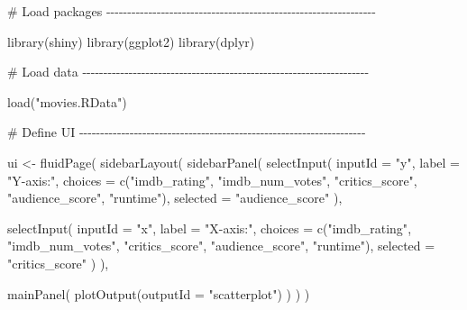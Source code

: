 \documentclass[
  letterpaper,
  DIV=11,
  numbers=noendperiod]{scrreprt}
\newenvironment{Shaded}{\begin{snugshade}}{\end{snugshade}}
\newcommand{\AttributeTok}[1]{\textcolor[rgb]{0.40,0.46,0.14}{#1}}
\newcommand{\CommentTok}[1]{\textcolor[rgb]{0.37,0.37,0.37}{#1}}
\newcommand{\FunctionTok}[1]{\textcolor[rgb]{0.28,0.35,0.67}{#1}}
\newcommand{\NormalTok}[1]{\textcolor[rgb]{0.00,0.46,0.62}{#1}}
\newcommand{\OtherTok}[1]{\textcolor[rgb]{0.00,0.46,0.62}{#1}}
\newcommand{\StringTok}[1]{\textcolor[rgb]{0.13,0.47,0.30}{#1}}
\begin{document}
\begin{Shaded}
\begin{Highlighting}[]
\CommentTok{\# Load packages {-}{-}{-}{-}{-}{-}{-}{-}{-}{-}{-}{-}{-}{-}{-}{-}{-}{-}{-}{-}{-}{-}{-}{-}{-}{-}{-}{-}{-}{-}{-}{-}{-}{-}{-}{-}{-}{-}{-}{-}{-}{-}{-}{-}{-}{-}{-}{-}{-}{-}{-}{-}{-}{-}{-}{-}{-}{-}{-}{-}{-}{-}{-}{-}}

\FunctionTok{library}\NormalTok{(shiny)}
\FunctionTok{library}\NormalTok{(ggplot2)}
\FunctionTok{library}\NormalTok{(dplyr)}

\CommentTok{\# Load data {-}{-}{-}{-}{-}{-}{-}{-}{-}{-}{-}{-}{-}{-}{-}{-}{-}{-}{-}{-}{-}{-}{-}{-}{-}{-}{-}{-}{-}{-}{-}{-}{-}{-}{-}{-}{-}{-}{-}{-}{-}{-}{-}{-}{-}{-}{-}{-}{-}{-}{-}{-}{-}{-}{-}{-}{-}{-}{-}{-}{-}{-}{-}{-}{-}{-}{-}{-}}

\FunctionTok{load}\NormalTok{(}\StringTok{"movies.RData"}\NormalTok{)}

\CommentTok{\# Define UI {-}{-}{-}{-}{-}{-}{-}{-}{-}{-}{-}{-}{-}{-}{-}{-}{-}{-}{-}{-}{-}{-}{-}{-}{-}{-}{-}{-}{-}{-}{-}{-}{-}{-}{-}{-}{-}{-}{-}{-}{-}{-}{-}{-}{-}{-}{-}{-}{-}{-}{-}{-}{-}{-}{-}{-}{-}{-}{-}{-}{-}{-}{-}{-}{-}{-}{-}{-}}

\NormalTok{ui }\OtherTok{\textless{}{-}} \FunctionTok{fluidPage}\NormalTok{(}
  \FunctionTok{sidebarLayout}\NormalTok{(}
    \FunctionTok{sidebarPanel}\NormalTok{(}
      \FunctionTok{selectInput}\NormalTok{(}
        \AttributeTok{inputId =} \StringTok{"y"}\NormalTok{,}
        \AttributeTok{label =} \StringTok{"Y{-}axis:"}\NormalTok{,}
        \AttributeTok{choices =} \FunctionTok{c}\NormalTok{(}\StringTok{"imdb\_rating"}\NormalTok{, }\StringTok{"imdb\_num\_votes"}\NormalTok{, }\StringTok{"critics\_score"}\NormalTok{, }\StringTok{"audience\_score"}\NormalTok{, }\StringTok{"runtime"}\NormalTok{),}
        \AttributeTok{selected =} \StringTok{"audience\_score"}
\NormalTok{      ),}

      \FunctionTok{selectInput}\NormalTok{(}
        \AttributeTok{inputId =} \StringTok{"x"}\NormalTok{,}
        \AttributeTok{label =} \StringTok{"X{-}axis:"}\NormalTok{,}
        \AttributeTok{choices =} \FunctionTok{c}\NormalTok{(}\StringTok{"imdb\_rating"}\NormalTok{, }\StringTok{"imdb\_num\_votes"}\NormalTok{, }\StringTok{"critics\_score"}\NormalTok{, }\StringTok{"audience\_score"}\NormalTok{, }\StringTok{"runtime"}\NormalTok{),}
        \AttributeTok{selected =} \StringTok{"critics\_score"}
\NormalTok{      )}
\NormalTok{    ),}

    \FunctionTok{mainPanel}\NormalTok{(}
      \FunctionTok{plotOutput}\NormalTok{(}\AttributeTok{outputId =} \StringTok{"scatterplot"}\NormalTok{)}
\NormalTok{    )}
\NormalTok{  )}
\NormalTok{)}


\end{Highlighting}
\end{Shaded}
\end{document}
